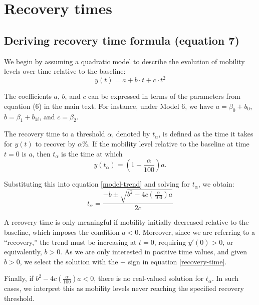 \documentclass[fleqn,10pt]{wlscirep}
\begin{document}
\newpage

\section{Recovery times}

\subsection{Deriving recovery time formula (equation 7)}

We begin by assuming a quadratic model to describe the evolution of mobility levels over time relative to the baseline:
\begin{equation}
    y(t) = a + b\cdot t + c\cdot t^2
\end{equation}\label{model-trend}

The coefficients \( a \), \( b \), and \( c \) can be expressed in terms of the parameters from equation (6) in the main text. For instance, under Model 6, we have \( a = \beta_0 + b_0 \), \( b = \beta_1 + b_{1i} \), and \( c = \beta_2 \).

The recovery time to a threshold \( \alpha \), denoted by \( t_{\alpha} \), is defined as the time it takes for \( y(t) \) to recover by \( \alpha\% \). If the mobility level relative to the baseline at time \( t = 0 \) is \( a \), then \( t_{\alpha} \) is the time at which
\[
y(t_{\alpha}) = \left(1 - \frac{\alpha}{100}\right) a.
\]

Substituting this into equation \eqref{model-trend} and solving for \( t_{\alpha} \), we obtain:
\begin{equation}
    t_{\alpha} = \frac{-b \pm \sqrt{b^2 - 4c \left( \frac{\alpha}{100} \right) a}}{2c}
\end{equation}\label{recovery-time}

A recovery time is only meaningful if mobility initially decreased relative to the baseline, which imposes the condition \( a < 0 \). Moreover, since we are referring to a ``recovery,'' the trend must be increasing at \( t = 0 \), requiring \( y'(0) > 0 \), or equivalently, \( b > 0 \). As we are only interested in positive time values, and given \( b > 0 \), we select the solution with the \( + \) sign in equation \eqref{recovery-time}.

Finally, if \( b^2 - 4c \left( \frac{\alpha}{100} \right) a < 0 \), there is no real-valued solution for \( t_{\alpha} \). In such cases, we interpret this as mobility levels never reaching the specified recovery threshold.
\end{document}
